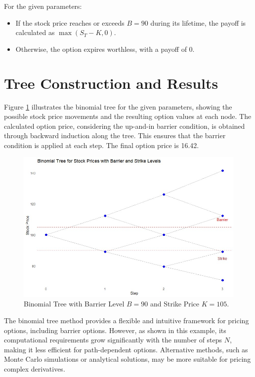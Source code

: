 For the given parameters:
\begin{itemize}
    \item If the stock price reaches or exceeds \(B = 90\) during its lifetime, the payoff is calculated as \(\max(S_T - K, 0)\).
    \item Otherwise, the option expires worthless, with a payoff of 0.
\end{itemize}

\section{Tree Construction and Results}

Figure \ref{fig:binomial-tree} illustrates the binomial tree for the given parameters, showing the possible stock price movements and the resulting option values at each node. The calculated option price, considering the up-and-in barrier condition, is obtained through backward induction along the tree. This ensures that the barrier condition is applied at each step. The final option price is 16.42.


\begin{figure}[h]
    \centering
    \includegraphics[width=.75\linewidth]{content/images/three-step.jpg}
    \caption{Binomial Tree with Barrier Level \(B = 90\) and Strike Price \(K = 105\).}
    \label{fig:binomial-tree}
\end{figure}

The binomial tree method provides a flexible and intuitive framework for pricing options, including barrier options. However, as shown in this example, its computational requirements grow significantly with the number of steps \(N\), making it less efficient for path-dependent options. Alternative methods, such as Monte Carlo simulations or analytical solutions, may be more suitable for pricing complex derivatives.
